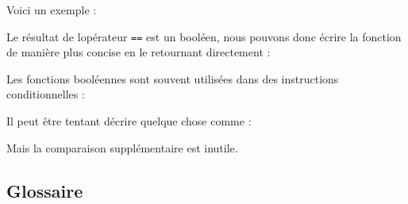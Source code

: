 Voici un exemple :

\begin{Shaded}
\begin{Highlighting}[]
\OperatorTok{\textgreater{}\textgreater{}\textgreater{}}\NormalTok{, }\NormalTok{)}
\OperatorTok{\textgreater{}\textgreater{}\textgreater{}}\NormalTok{, }\NormalTok{)}
\end{Highlighting}
\end{Shaded}

Le résultat de l\textquotesingle opérateur \texttt{==} est un booléen,
nous pouvons donc écrire la fonction de manière plus concise en le
retournant directement :

\begin{Shaded}
\begin{Highlighting}[]
    \OperatorTok{\%}\OperatorTok{==} 
\end{Highlighting}
\end{Shaded}

Les fonctions booléennes sont souvent utilisées dans des instructions
conditionnelles :

\begin{Shaded}
\begin{Highlighting}[]
    \NormalTok{(}\NormalTok{)}
\end{Highlighting}
\end{Shaded}

Il peut être tentant d\textquotesingle écrire quelque chose comme :

\begin{Shaded}
\begin{Highlighting}[]
\OperatorTok{==} \NormalTok{:}
    \NormalTok{(}\NormalTok{)}
\end{Highlighting}
\end{Shaded}

Mais la comparaison supplémentaire est inutile.

\hypertarget{glossaire}{%
\subsection{Glossaire}\label{glossaire}}

